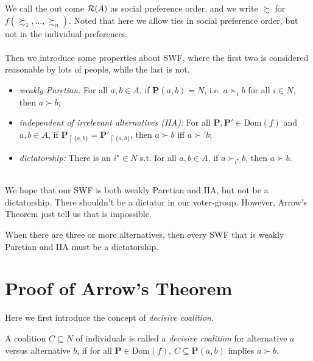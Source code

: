We call the out come $\mathcal{R}(A)$ as social preference order, and we write $\succsim$ for $f(\succsim_1,\dots, \succsim_n)$. Noted that here we allow ties in social preference order, but not in the individual preferences.\\
~\\
Then we introduce some properties about SWF, where the first two is considered reasonable by lots of people, while the last is not.

\begin{itemize}
    \item \textit{weakly Paretian:} For all $a,b \in A$, if $\mathbf{P}(a,b) = N$, i.e. $a \succ_i b$ for all $i \in N$, then $a \succ b$;
    \item \textit{independent of irrelevant alternatives (IIA):} For all $\mathbf{P},\mathbf{P'} \in \mathrm{Dom}(f)$ and $a ,b \in A$, if $\mathbf{P}_{\upharpoonright\{a,b\}} = \mathbf{P'}_{\upharpoonright\{a,b\}}$, then $a \succ b$ iff $a \succ' b$;
    \item \textit{dictatorship:} There is an $i^\star \in N$ s.t. for all $a,b \in A$, if $a \succ_{i^\star} b$, then $a \succ b$.
\end{itemize}
~\\
We hope that our SWF is both weakly Paretian and IIA, but not be a dictatorship. There shouldn't be a dictator in our voter-group. However, Arrow's Theorem just tell us that is impossible.

\begin{theorem}
    When there are three or more alternatives, then every SWF that is weakly Paretian and IIA must be a dictatorship.
\end{theorem}

\section{Proof of Arrow's Theorem}

Here we first introduce the concept of \textit{decisive coalition}.

\begin{definition}
    A coalition $C \subseteq N$ of individuals is called a \textit{decisive coalition} for alternative $a$ versus alternative $b$, if for all $\mathbf{P} \in \mathrm{Dom}(f)$, $C \subseteq \mathbf{P}(a,b)$ implies $a \succ b$.
\end{definition}

